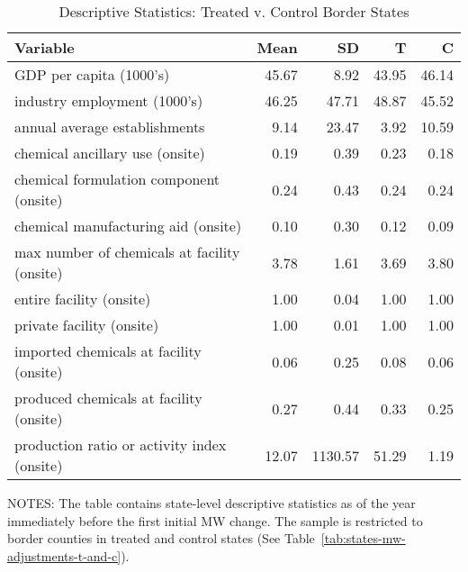 \begin{table}[H]
    \centering
    \caption{Descriptive Statistics: Treated v. Control Border States}
    \label{tab:descriptive-statistics-control-border-states}
    \begin{tabular}{lrrrr}
        \toprule \toprule
        Variable                                     & Mean  & SD      & T     & C     \\ \midrule
        GDP per capita (1000's)                      & 45.67 & 8.92    & 43.95 & 46.14 \\
        industry employment (1000's)                 & 46.25 & 47.71   & 48.87 & 45.52 \\
        annual average establishments                & 9.14  & 23.47   & 3.92  & 10.59 \\
        chemical ancillary use (onsite)              & 0.19  & 0.39    & 0.23  & 0.18  \\
        chemical formulation component (onsite)      & 0.24  & 0.43    & 0.24  & 0.24  \\
        chemical manufacturing aid (onsite)          & 0.10  & 0.30    & 0.12  & 0.09  \\
        max number of chemicals at facility (onsite) & 3.78  & 1.61    & 3.69  & 3.80  \\
        entire facility (onsite)                     & 1.00  & 0.04    & 1.00  & 1.00  \\
        private facility (onsite)                    & 1.00  & 0.01    & 1.00  & 1.00  \\
        imported chemicals at facility (onsite)      & 0.06  & 0.25    & 0.08  & 0.06  \\
        produced chemicals at facility (onsite)      & 0.27  & 0.44    & 0.33  & 0.25  \\
        production ratio or activity index (onsite)  & 12.07 & 1130.57 & 51.29 & 1.19  \\ \bottomrule\bottomrule
    \end{tabular}
    \begin{minipage}{13.5cm}
        \vspace{0.05in}
        \tiny NOTES: The table contains state-level descriptive statistics as of the year immediately before the first initial MW change. The sample is restricted to border counties in treated and control states (See Table~\ref{tab:states-mw-adjustments-t-and-c}).
    \end{minipage}
\end{table}
